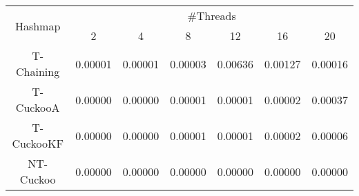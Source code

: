 \begin{tabular}{|c|c|c|c|c|c|c|}
\hline
\multirow{2}{*}{Hashmap} & \multicolumn{6}{c|}{\#Threads}\\\cline{2-7}& 2 & 4 & 8 & 12 & 16 & 20\\
\hline
\hline
T-Chaining & 0.00001 & 0.00001 & 0.00003 & 0.00636 & 0.00127 & 0.00016\\
T-CuckooA & 0.00000 & 0.00000 & 0.00001 & 0.00001 & 0.00002 & 0.00037\\
T-CuckooKF & 0.00000 & 0.00000 & 0.00001 & 0.00001 & 0.00002 & 0.00006\\
NT-Cuckoo & 0.00000 & 0.00000 & 0.00000 & 0.00000 & 0.00000 & 0.00000\\
\hline
\end{tabular}

